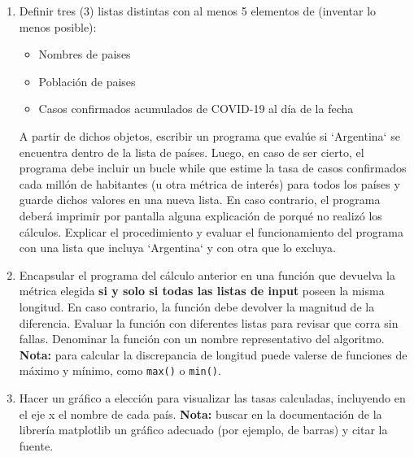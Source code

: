 \documentclass[a4paper,11pt]{article}
\begin{document}
\begin{enumerate}
		\item Definir tres (3) listas distintas con al menos 5 elementos de (inventar lo menos posible):
		    \begin{itemize}
		        \item Nombres de paises
		        \item Población de paises
		        \item Casos confirmados acumulados de COVID-19 al día de la fecha  
		    \end{itemize}
        A partir de dichos objetos, escribir un programa que evalúe si `Argentina` se encuentra dentro de la lista de países. Luego, en caso de ser cierto, el programa debe incluir un bucle while que estime la tasa de casos confirmados cada millón de habitantes (u otra métrica de interés) para todos los países y guarde dichos valores en una nueva lista. En caso contrario, el programa deberá imprimir por pantalla alguna explicación de porqué no realizó los cálculos. Explicar el procedimiento y evaluar el funcionamiento del programa con una lista que incluya `Argentina` y con otra que lo excluya.
        \item Encapsular el programa del cálculo anterior en una función que devuelva la métrica elegida \textbf{si y solo si todas las listas de input} poseen la misma longitud. En caso contrario, la función debe devolver la magnitud de la diferencia. Evaluar la función con diferentes listas para revisar que corra sin fallas. Denominar la función con un nombre representativo del algoritmo. \textbf{Nota:} para calcular la discrepancia de longitud puede valerse de funciones de máximo y mínimo, como \texttt{max()} o \texttt{min()}.
        \item Hacer un gráfico a elección para visualizar las tasas calculadas, incluyendo en el eje x el nombre de cada país. \textbf{Nota:} buscar en la documentación de la librería matplotlib un gráfico adecuado (por ejemplo, de barras) y citar la fuente.

\end{enumerate}
\end{document}
